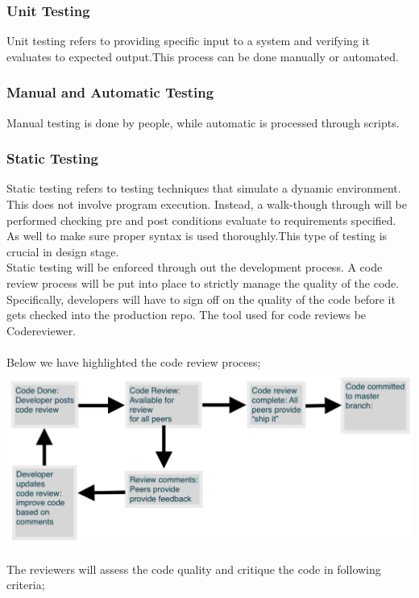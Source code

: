\documentclass[12pt]{article}
\begin{document}
\subsubsection{Unit Testing}
Unit testing refers to providing specific input to a system and verifying it evaluates to expected output.This process can be done manually or automated.

\subsubsection{Manual and Automatic Testing}
Manual testing is done by people, while automatic is processed through scripts. 

\subsubsection{Static Testing}
Static testing refers to testing techniques that simulate a dynamic environment. This does not involve program execution. Instead, a walk-though through will be performed checking pre and post conditions evaluate to requirements specified. As well to make sure proper syntax is used thoroughly.This type of testing is crucial in design stage. \\
Static testing will be enforced through out the development process. A code review process will be put into place to strictly manage the quality of the code. Specifically, developers will have to sign off on the quality of the code before it gets checked into the production repo. The tool used for code reviews be Codereviewer. \\\\
Below we have highlighted the code review process;\\
\includegraphics[width=\textwidth,height=\textheight,keepaspectratio]{review_process.png}\\\\
The reviewers will assess the code quality and critique the code in following criteria;\\
\end{document}

